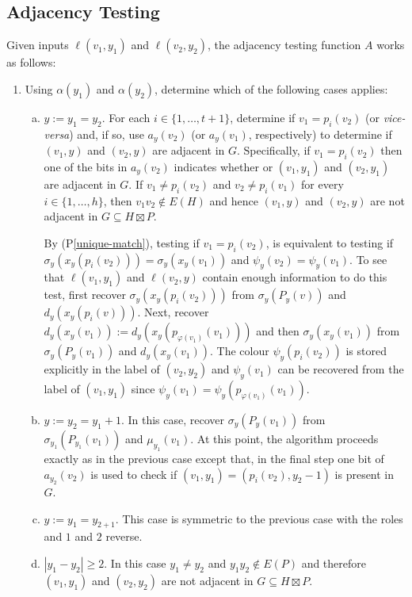 \documentclass{patmorin}
\newcommand{\pref}[1]{(P\ref{#1})}
\begin{document}
\subsection{Adjacency Testing}

Given inputs $\ell(v_1,y_1)$ and $\ell(v_2,y_2)$, the adjacency testing function $A$ works as follows:
\begin{enumerate}
    \item Using $\alpha(y_1)$ and $\alpha(y_2)$, determine which of the following cases applies:
    \begin{enumerate}[(a)]
        \item $y:=y_1=y_2$.  For each $i\in\{1,\ldots,t+1\}$, determine if $v_1=p_i(v_2)$ (or \textit{vice-versa}) and, if so, use $a_y(v_2)$ (or $a_y(v_1)$, respectively) to determine if $(v_1,y)$ and $(v_2,y)$ are adjacent in $G$. Specifically, if $v_1=p_i(v_2)$ then one of the bits in $a_y(v_2)$ indicates whether or $(v_1,y_1)$ and $(v_2,y_1)$ are adjacent in $G$. If $v_1\neq p_i(v_2)$ and $v_2\neq p_i(v_1)$ for every $i\in\{1,\ldots,h\}$, then $v_1v_2\not\in E(H)$ and hence $(v_1,y)$ and $(v_2,y)$ are not adjacent in $G\subseteq H\boxtimes P$.

        By \pref{unique-match}, testing if $v_1=p_i(v_2)$, is equivalent to testing if $\sigma_y(x_y(p_i(v_2)))=\sigma_y(x_y(v_1))$ and $\psi_y(v_2)=\psi_y(v_1)$.  To see that $\ell(v_1,y_1)$ and $\ell(v_2,y)$ contain enough information to do this test, first recover $\sigma_y(x_y(p_i(v_2)))$ from $\sigma_y(P_y(v))$ and $d_y(x_y(p_i(v)))$.  Next, recover $d_y(x_y(v_1)):=d_y(x_y(p_{\varphi(v_1)}(v_1)))$ and then  $\sigma_y(x_y(v_1))$ from $\sigma_y(P_y(v_1))$ and $d_y(x_y(v_1))$. The colour $\psi_y(p_i(v_2))$ is stored explicitly in the label of $(v_2,y_2)$ and $\psi_y(v_1)$ can be recovered from the label of $(v_1,y_1)$ since $\psi_y(v_1)=\psi_y(p_{\varphi(v_1)}(v_1))$.

        \item $y:=y_2=y_1+1$.  In this case, recover $\sigma_y(P_y(v_1))$ from $\sigma_{y_1}(P_{y_1}(v_1))$ and $\mu_{y_1}(v_1)$.  At this point, the algorithm proceeds exactly as in the previous case except that, in the final step one bit of $a_{y_2}(v_2)$ is used to check if $(v_1,y_1)=(p_i(v_2),y_2-1)$ is present in $G$.

        \item $y:=y_1=y_{2+1}$. This case is symmetric to the previous case with the roles and $1$ and $2$ reverse.

        \item $|y_1-y_2|\ge 2$.  In this case $y_1\neq y_2$ and $y_1y_2\not\in E(P)$ and therefore $(v_1,y_1)$ and $(v_2,y_2)$ are not adjacent in $G\subseteq H\boxtimes P$.
    \end{enumerate}
\end{enumerate}
\end{document}
